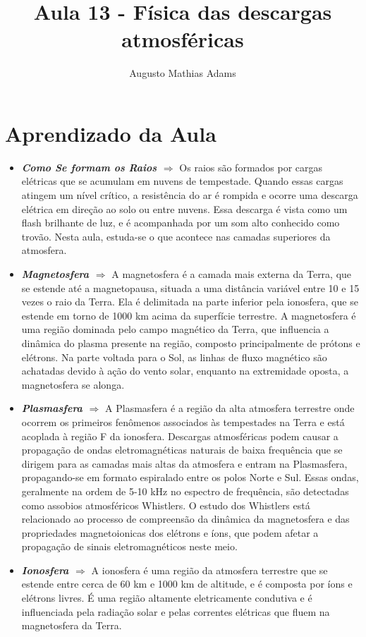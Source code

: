 \documentclass[a4paper, 12pt, onecolumn,singlespacing]{article}
\title{Aula 13 - Física das descargas atmosféricas}
\author[1]{Augusto Mathias Adams}
\affil[1]{augusto.adams@ufpr.br}
\begin{document}
	
	\maketitle
	
	\section{Aprendizado da Aula}
	
	\begin{itemize}
		\item \textbf{\textit{Como Se formam os Raios $\Rightarrow$ }} Os raios são formados por cargas elétricas que se acumulam em nuvens de tempestade. Quando essas cargas atingem um nível crítico, a resistência do ar é rompida e ocorre uma descarga elétrica em direção ao solo ou entre nuvens. Essa descarga é vista como um flash brilhante de luz, e é acompanhada por um som alto conhecido como trovão. Nesta aula, estuda-se o que acontece nas camadas superiores da atmosfera.
		\item \textbf{\textit{Magnetosfera $\Rightarrow$ }}A magnetosfera é a camada mais externa da Terra, que se estende até a magnetopausa, situada a uma distância variável entre 10 e 15 vezes o raio da Terra. Ela é delimitada na parte inferior pela ionosfera, que se estende em torno de 1000 km acima da superfície terrestre. A magnetosfera é uma região dominada pelo campo magnético da Terra, que influencia a dinâmica do plasma presente na região, composto principalmente de prótons e elétrons. Na parte voltada para o Sol, as linhas de fluxo magnético são achatadas devido à ação do vento solar, enquanto na extremidade oposta, a magnetosfera se alonga.
		\item \textbf{\textit{Plasmasfera $\Rightarrow$ }} A Plasmasfera é a região da alta atmosfera terrestre onde ocorrem os primeiros fenômenos associados às tempestades na Terra e está acoplada à região F da ionosfera. Descargas atmosféricas podem causar a propagação de ondas eletromagnéticas naturais de baixa frequência que se dirigem para as camadas mais altas da atmosfera e entram na Plasmasfera, propagando-se em formato espiralado entre os polos Norte e Sul. Essas ondas, geralmente na ordem de 5-10 kHz no espectro de frequência, são detectadas como assobios atmosféricos Whistlers. O estudo dos Whistlers está relacionado ao processo de compreensão da dinâmica da magnetosfera e das propriedades magnetoionicas dos elétrons e íons, que podem afetar a propagação de sinais eletromagnéticos neste meio.
		\item \textbf{\textit{Ionosfera $\Rightarrow$ }}A ionosfera é uma região da atmosfera terrestre que se estende entre cerca de 60 km e 1000 km de altitude, e é composta por íons e elétrons livres. É uma região altamente eletricamente condutiva e é influenciada pela radiação solar e pelas correntes elétricas que fluem na magnetosfera da Terra.
		

\end{itemize}
\end{document}
